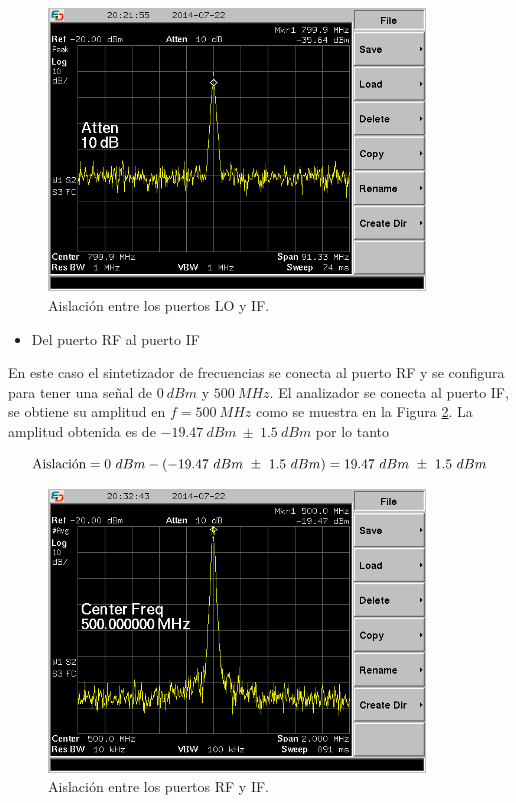\documentclass[a4paper,10pt]{article}
\begin{document}
	\begin{figure}[!htb]
		\centering
		\includegraphics[width=10cm]{Images/SCREN531.png}
		\caption{Aislaci\'on entre los puertos LO y IF.}
		\label{isolation1fran}
	\end{figure}	
	
	\begin{itemize}
		\item Del puerto RF al puerto IF
	\end{itemize}
	
	\indent En este caso el sintetizador de frecuencias se conecta al puerto RF y se configura para tener una se\~nal de $0~dBm$ y $500~MHz$. El analizador se conecta al puerto IF, se obtiene su amplitud en $f=500~MHz$ como se muestra en la Figura \ref{isolation2fran}. La amplitud obtenida es de $-19.47~dBm~\pm~1.5~dBm$ por lo tanto
		
		$$\textmd{Aislaci\'on}=0~dBm-(-19.47~dBm~\pm~1.5~dBm)=19.47~dBm~\pm~1.5~dBm$$
	
	\begin{figure}[!htb]
		\centering
		\includegraphics[width=10cm]{Images/SCREN534.png}
		\caption{Aislaci\'on entre los puertos RF y IF.}
		\label{isolation2fran}
	\end{figure}
	
\end{document}
